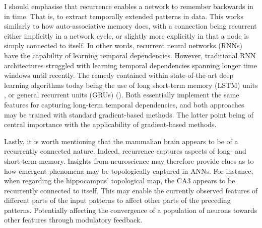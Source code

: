 I should emphasise that recurrence enables a network to remember backwards in in time. That is, to extract temporally extended patterns in data. This works similarly to how auto-associative memory does, with a connection being recurrent either implicitly in a network cycle, or slightly more explicitly in that a node is simply connected to itself. In other words, recurrent neural networks (RNNs) have the capability of learning temporal dependencies. However, traditional RNN architectures struggled with learning temporal dependencies spanning longer time windows until recently. The remedy contained within state-of-the-art deep learning algorithms today being the use of long short-term memory (LSTM) units \cite{Hochreiter1997}, or general recurrent units (GRUs) (\cite{Cho2014}). Both essentially implement the same features for capturing long-term temporal dependencies, and both approaches may be trained with standard gradient-based methods. The latter point being of central importance with the applicability of gradient-based methods.

Lastly, it is worth mentioning that the mammalian brain appears to be of a recurrently connected nature. Indeed, recurrence captures aspects of long- and short-term memory. Insights from neuroscience may therefore provide clues as to how emergent phenomena may be topologically captured in ANNs.
For instance, when regarding the hippocampus' topological map, the CA3 appears to be recurrently connected to itself. This may enable the currently observed features of different parts of the input patterns to affect other parts of the preceding patterns. Potentially affecting the convergence of a population of neurons towards other features through modulatory feedback.
\\

